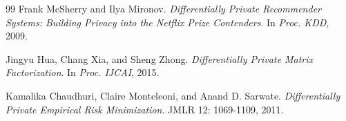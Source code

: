 \documentclass[11pt]{article}
\theoremstyle{remark}
\theoremstyle{definition}
\theoremstyle{plain}
\begin{document}
\begin{thebibliography}{99}
 Frank McSherry and Ilya Mironov. \textit{Differentially Private Recommender Systems: Building Privacy into the Netflix Prize Contenders}. In \textit{Proc. KDD}, 2009.

 Jingyu Hua, Chang Xia, and Sheng Zhong. \textit{Differentially Private Matrix Factorization}. In \textit{Proc. IJCAI}, 2015.

 Kamalika Chaudhuri, Claire Monteleoni, and Anand D. Sarwate. \textit{Differentially Private Empirical Risk Minimization}. JMLR 12: 1069-1109, 2011.

\end{thebibliography}
\end{document}
